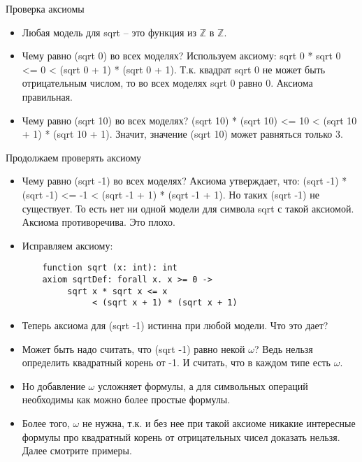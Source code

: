 \documentclass[hyperref={unicode=true}]{beamer}
\begin{document}
    \begin{frame}{Проверка аксиомы}
    \begin{itemize}
    \item
    Любая модель для sqrt -- это функция из $\mathbb{Z}$ в $\mathbb{Z}$.
    \item
    Чему равно (sqrt 0) во всех моделях? Используем аксиому:
    sqrt 0 * sqrt 0 <= 0 < (sqrt 0 + 1) * (sqrt 0 + 1).
    Т.к. квадрат sqrt 0 не может быть отрицательным числом, то
    во всех моделях sqrt 0 равно 0. Аксиома правильная.
    \item
    Чему равно (sqrt 10) во всех моделях?
    (sqrt 10) * (sqrt 10) <= 10 < (sqrt 10 + 1) * (sqrt 10 + 1).
    Значит, значение (sqrt 10) может равняться только 3.
    \end{itemize}
    \end{frame}

    \begin{frame}[fragile]{Продолжаем проверять аксиому}
    \begin{itemize}
    \item
    Чему равно (sqrt -1) во всех моделях? Аксиома утверждает, что:
    (sqrt -1) * (sqrt -1) <= -1 < (sqrt -1 + 1) * (sqrt -1 + 1).
    Но таких (sqrt -1) не существует. То есть нет ни одной модели
    для символа sqrt с такой аксиомой. Аксиома противоречива. Это плохо.
    \item
    Исправляем аксиому:
    \begin{lstlisting}
    function sqrt (x: int): int
    axiom sqrtDef: forall x. x >= 0 ->
         sqrt x * sqrt x <= x
              < (sqrt x + 1) * (sqrt x + 1)
    \end{lstlisting}
    \end{itemize}
    \end{frame}

    \begin{frame}
    \begin{itemize}
    \item
    Теперь аксиома для (sqrt -1) истинна при любой модели. Что это дает?
    \item
    Может быть надо считать, что (sqrt -1) равно некой $\omega$? Ведь
    нельзя определить квадратный корень от -1. И считать, что в каждом
    типе есть $\omega$.
    \item
    Но добавление $\omega$ усложняет формулы, а для символьных операций
    необходимы как можно более простые формулы.
    \item
    Более того, $\omega$ не нужна, т.к. и без нее при такой аксиоме
    никакие интересные формулы про
    квадратный корень от отрицательных чисел доказать нельзя.
    Далее смотрите примеры.
    \end{itemize}
    \end{frame}
\end{document}
